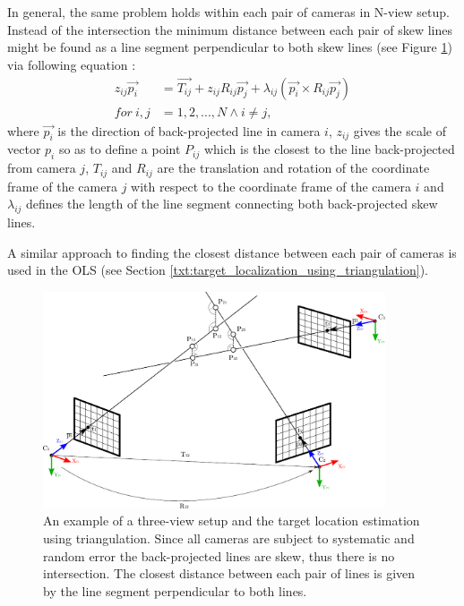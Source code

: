 In general, the same problem holds within each pair of cameras in N-view setup. Instead of the intersection the minimum distance between each pair of skew lines might be found as a line segment perpendicular to both skew lines (see Figure \ref{fig:multi_view_intersection}) via following equation \cite{Forsyth:2002:CVM:580035}:
\begin{align}
	z_{ij}\vec{p_{i}} &= \vec{T_{ij}} + z_{ij}R_{ij}\vec{p_{j}} + \lambda_{ij}(\vec{p_{i}} \times R_{ij}\vec{p_{j}})\\
	for~i,j           &= 1,2,...,N \land i \neq j,
\end{align}
where $\vec{p_{i}}$ is the direction of back-projected line in camera $i$, $z_{ij}$ gives the scale of vector ${p_{i}}$ so as to define a point $P_{ij}$ which is the closest to the line back-projected from camera $j$, $T_{ij}$ and $R_{ij}$ are the translation and rotation of the coordinate frame of the camera $j$ with respect to the coordinate frame of the camera $i$ and $\lambda_{ij}$ defines the length of the line segment connecting both back-projected skew lines.

A similar approach to finding the closest distance between each pair of cameras is used in the OLS (see Section \ref{txt:target_localization_using_triangulation}).

\begin{figure}[tbh]
	\centering
	\includegraphics[width=0.9\textwidth]{fig/multi_view_intersection.pdf}
	\caption{An example of a three-view setup and the target location estimation using triangulation. Since all cameras are subject to systematic and random error the back-projected lines are skew, thus there is no intersection. The closest distance between each pair of lines is given by the line segment perpendicular to both lines.}
	\label{fig:multi_view_intersection}
\end{figure}

